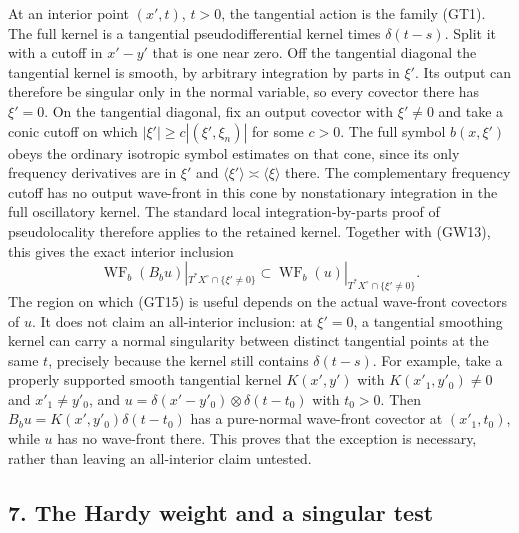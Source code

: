 \documentclass[
  11pt,
]{article}
\makeatletter
\let\ReaderOriginalAnchorStart\hyper@anchorstart
\let\ReaderOriginalAnchorEnd\hyper@anchorend
\let\ReaderPendingAliases\@empty
\def\ReaderArmAliases#1{\gdef\ReaderPendingAliases{#1}}
\def\hyper@anchorstart#1{\ReaderIfNativeAnchorTF{#1}{\ReaderPendingAliases\global\let\ReaderPendingAliases\@empty}{}\ReaderOriginalAnchorStart{#1}}
\makeatother
\begin{document}
At an interior point \((x',t)\), \(t>0\), the tangential action is the
family (GT1). The full kernel is a tangential pseudodifferential kernel
times \(\delta(t-s)\). Split it with a cutoff in \(x'-y'\) that is one
near zero. Off the tangential diagonal the tangential kernel is smooth,
by arbitrary integration by parts in \(\xi'\). Its output can therefore
be singular only in the normal variable, so every covector there has
\(\xi'=0\). On the tangential diagonal, fix an output covector with
\(\xi'\ne0\) and take a conic cutoff on which
\(|\xi'|\ge c|(\xi',\xi_n)|\) for some \(c>0\). The full symbol
\(b(x,\xi')\) obeys the ordinary isotropic symbol estimates on that
cone, since its only frequency derivatives are in \(\xi'\) and
\(\langle\xi'\rangle\asymp\langle\xi\rangle\) there. The complementary
frequency cutoff has no output wave-front in this cone by nonstationary
integration in the full oscillatory kernel. The standard local
integration-by-parts proof of pseudolocality therefore applies to the
retained kernel. Together with (GW13), this gives the exact interior
inclusion \[
 \operatorname{WF}_b(B_bu)|_{T^*X^\circ\cap\{\xi'\ne0\}}
       \subset
       \operatorname{WF}_b(u)|_{T^*X^\circ\cap\{\xi'\ne0\}}.
 \tag{GT15}
\] The region on which (GT15) is useful depends on the actual wave-front
covectors of \(u\). It does not claim an all-interior inclusion: at
\(\xi'=0\), a tangential smoothing kernel can carry a normal singularity
between distinct tangential points at the same \(t\), precisely because
the kernel still contains \(\delta(t-s)\). For example, take a properly
supported smooth tangential kernel \(K(x',y')\) with
\(K(x'_1,y'_0)\ne0\) and \(x'_1\ne y'_0\), and
\(u=\delta(x'-y'_0)\otimes\delta(t-t_0)\) with \(t_0>0\). Then
\(B_bu=K(x',y'_0)\delta(t-t_0)\) has a pure-normal wave-front covector
at \((x'_1,t_0)\), while \(u\) has no wave-front there. This proves that
the exception is necessary, rather than leaving an all-interior claim
untested.

\ReaderArmAliases{\ReaderOriginalAnchorStart{AN03-GBD-007}\ReaderOriginalAnchorEnd\begingroup\expandafter\def\csname @currentHref\endcsname{AN03-GBD-007}\label{AN03-GBD-007}\endgroup\ReaderOriginalAnchorStart{7-the-hardy-weight-and-a-singular-test}\ReaderOriginalAnchorEnd\begingroup\expandafter\def\csname @currentHref\endcsname{7-the-hardy-weight-and-a-singular-test}\label{7-the-hardy-weight-and-a-singular-test}\endgroup}
\subsection{7. The Hardy weight and a singular
test}\label{the-hardy-weight-and-a-singular-test}
\end{document}
